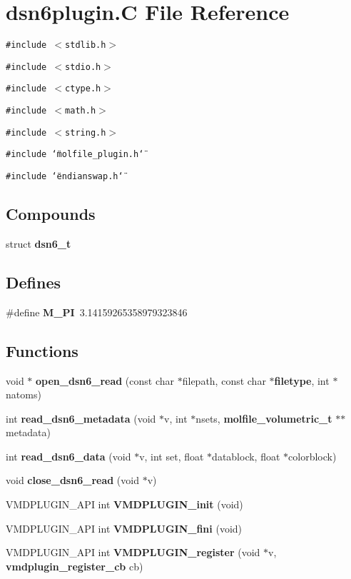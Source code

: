 \section{dsn6plugin.C File Reference}
\label{dsn6plugin_8C}
{\tt \#include $<$stdlib.h$>$}\par
{\tt \#include $<$stdio.h$>$}\par
{\tt \#include $<$ctype.h$>$}\par
{\tt \#include $<$math.h$>$}\par
{\tt \#include $<$string.h$>$}\par
{\tt \#include \char`\"{}molfile\_\-plugin.h\char`\"{}}\par
{\tt \#include \char`\"{}endianswap.h\char`\"{}}\par
\subsection*{Compounds}
\begin{CompactItemize}
\item 
struct {\bf dsn6\_\-t}
\end{CompactItemize}
\subsection*{Defines}
\begin{CompactItemize}
\item 
\#define {\bf M\_\-PI}\ 3.14159265358979323846
\end{CompactItemize}
\subsection*{Functions}
\begin{CompactItemize}
\item 
void $\ast$ {\bf open\_\-dsn6\_\-read} (const char $\ast$filepath, const char $\ast${\bf filetype}, int $\ast$natoms)
\item 
int {\bf read\_\-dsn6\_\-metadata} (void $\ast$v, int $\ast$nsets, {\bf molfile\_\-volumetric\_\-t} $\ast$$\ast$metadata)
\item 
int {\bf read\_\-dsn6\_\-data} (void $\ast$v, int set, float $\ast$datablock, float $\ast$colorblock)
\item 
void {\bf close\_\-dsn6\_\-read} (void $\ast$v)
\item 
VMDPLUGIN\_\-API int {\bf VMDPLUGIN\_\-init} (void)
\item 
VMDPLUGIN\_\-API int {\bf VMDPLUGIN\_\-fini} (void)
\item 
VMDPLUGIN\_\-API int {\bf VMDPLUGIN\_\-register} (void $\ast$v, {\bf vmdplugin\_\-register\_\-cb} cb)
\end{CompactItemize}
